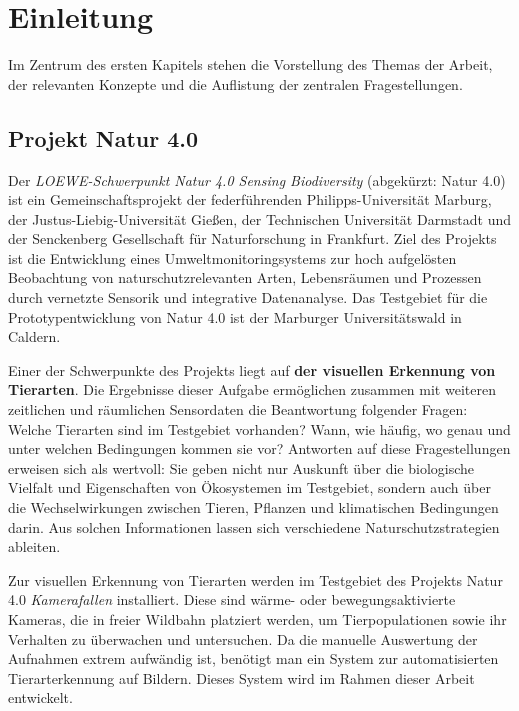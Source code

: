 \chapter{Einleitung} \label{chap:intro}

Im Zentrum des ersten Kapitels stehen die Vorstellung des Themas der Arbeit, der relevanten Konzepte und die Auflistung der zentralen Fragestellungen.

\section{Projekt Natur 4.0}

Der \emph{LOEWE-Schwerpunkt Natur 4.0 Sensing Biodiversity} (abgekürzt: Natur 4.0) ist ein Gemeinschaftsprojekt der federführenden Philipps-Universität Marburg, der Justus-Liebig-Universität Gießen, der Technischen Universität Darmstadt und der Senckenberg Gesellschaft für Naturforschung in Frankfurt. Ziel des Projekts ist die Entwicklung eines Umweltmonitoringsystems zur hoch aufgelösten Beobachtung von naturschutzrelevanten Arten, Lebensräumen und Prozessen durch vernetzte Sensorik und integrative Datenanalyse. Das Testgebiet für die Prototypentwicklung von Natur 4.0 ist der Marburger Universitätswald in Caldern.

Einer der Schwerpunkte des Projekts liegt auf \textbf{der visuellen Erkennung von Tierarten}. Die Ergebnisse dieser Aufgabe ermöglichen zusammen mit weiteren zeitlichen und räumlichen Sensordaten die Beantwortung folgender Fragen: Welche Tierarten sind im Testgebiet vorhanden? Wann, wie häufig, wo genau und unter welchen Bedingungen kommen sie vor? Antworten auf diese Fragestellungen erweisen sich als wertvoll: Sie geben nicht nur Auskunft über die biologische Vielfalt und Eigenschaften von Ökosystemen im Testgebiet, sondern auch über die Wechselwirkungen zwischen Tieren, Pflanzen und klimatischen Bedingungen darin. Aus solchen Informationen lassen sich verschiedene Naturschutzstrategien ableiten.

Zur visuellen Erkennung von Tierarten werden im Testgebiet des Projekts Natur 4.0 \emph{Kamerafallen} installiert. Diese sind wärme- oder bewegungsaktivierte Kameras, die in freier Wildbahn platziert werden, um Tierpopulationen sowie ihr Verhalten zu überwachen und untersuchen. Da die manuelle Auswertung der Aufnahmen extrem aufwändig ist, benötigt man ein System zur automatisierten Tierarterkennung auf Bildern. Dieses System wird im Rahmen dieser Arbeit entwickelt.

